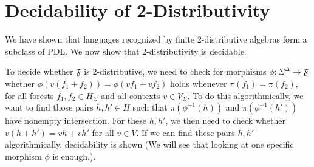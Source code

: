 \documentclass[sigplan,9pt]{acmart}\settopmatter{printfolios=true,printccs=false,printacmref=false}
\newcounter{thm}
\theoremstyle{definition}
\newcommand{\La}[0]{{\mathcal{L}}}
\newcommand{\Ff}[0]{{\mathfrak{F}}}
\begin{document}
\section{Decidability of 2-Distributivity}

We have shown that languages recognized by finite 2-distributive algebras form a subclass of PDL.
We now show that 2-distributivity is decidable.


To decide whether $\Ff$ is 2-distributive, we need to check for morphisms $\phi : \Sigma^\Delta\rightarrow\Ff$ whether $\phi(v(f_1+f_2)) = \phi(vf_1 + vf_2)$ holds whenever $\pi(f_1) = \pi(f_2)$, for all forests $f_1, f_2 \in H_\Sigma$ and all contexts $v \in V_\Sigma$.
To do this algorithmically, we want to find those pairs $h, h' \in H$ such that $\pi(\phi^{-1}(h))$ and $\pi(\phi^{-1}(h'))$ have nonempty intersection. For these $h, h'$, we then need to check whether $v(h+h') = vh+vh'$ for all $v \in V$. If we can find these pairs $h, h'$ algorithmically, decidability is shown (We will see that looking at one specific morphism $\phi$ is enough.).
\end{document}
